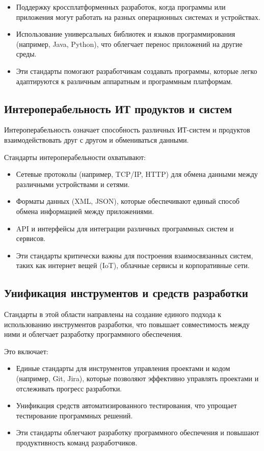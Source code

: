 \begin{itemize}
	\item Поддержку кроссплатформенных разработок,
		когда программы или приложения могут работать
		на разных операционных системах и устройствах.
	\item Использование универсальных библиотек и языков программирования
		(например, Java, Python),
		что облегчает перенос приложений на другие среды.
	\item Эти стандарты помогают разработчикам создавать программы,
		которые легко адаптируются к различным аппаратным
		и программным платформам.
\end{itemize}

\subsection{Интероперабельность ИТ продуктов и систем}

Интероперабельность означает способность различных ИТ-систем
и продуктов взаимодействовать друг с другом и обмениваться данными.

Стандарты интероперабельности охватывают:

\begin{itemize}
	\item Сетевые протоколы (например, TCP/IP, HTTP)
		для обмена данными между различными устройствами и сетями.
	\item Форматы данных (XML, JSON),
		которые обеспечивают единый способ обмена информацией
		между приложениями.
	\item API и интерфейсы для интеграции различных программных систем
		и сервисов.
	\item Эти стандарты критически важны для построения взаимосвязанных систем,
		таких как интернет вещей (IoT), облачные сервисы и корпоративные сети.
\end{itemize}

\subsection{Унификация инструментов и средств разработки}

Стандарты в этой области направлены на создание единого подхода
к использованию инструментов разработки,
что повышает совместимость между ними
и облегчает разработку программного обеспечения.

Это включает:

\begin{itemize}
	\item Единые стандарты для инструментов управления проектами
		и кодом (например, Git, Jira),
		которые позволяют эффективно управлять проектами
		и отслеживать прогресс разработки.
	\item Унификация средств автоматизированного тестирования,
		что упрощает тестирование программных решений.
	\item Эти стандарты облегчают разработку программного обеспечения
		и повышают продуктивность команд разработчиков.
\end{itemize}

